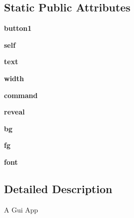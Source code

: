 \subsection*{Static Public Attributes}
\begin{DoxyCompactItemize}
\item 
\hypertarget{class_g_u_i_1_1_application_a6a8ca3a5882888d349cdedc911d175c2}{}\label{class_g_u_i_1_1_application_a6a8ca3a5882888d349cdedc911d175c2} 
{\bfseries button1}
\item 
\hypertarget{class_g_u_i_1_1_application_a90c619c846c3cea133c48377d4a4228d}{}\label{class_g_u_i_1_1_application_a90c619c846c3cea133c48377d4a4228d} 
{\bfseries self}
\item 
\hypertarget{class_g_u_i_1_1_application_ac13dddd2ea333e0d578157201347c34e}{}\label{class_g_u_i_1_1_application_ac13dddd2ea333e0d578157201347c34e} 
{\bfseries text}
\item 
\hypertarget{class_g_u_i_1_1_application_a5f870ca4bff8c0dfb37ddb5d307babb1}{}\label{class_g_u_i_1_1_application_a5f870ca4bff8c0dfb37ddb5d307babb1} 
{\bfseries width}
\item 
\hypertarget{class_g_u_i_1_1_application_a31931931fb7c0b4bae77306bcf5850c2}{}\label{class_g_u_i_1_1_application_a31931931fb7c0b4bae77306bcf5850c2} 
{\bfseries command}
\item 
\hypertarget{class_g_u_i_1_1_application_a84d12d24908d69fac56c33e65e5a7012}{}\label{class_g_u_i_1_1_application_a84d12d24908d69fac56c33e65e5a7012} 
{\bfseries reveal}
\item 
\hypertarget{class_g_u_i_1_1_application_a439307e042d5ce4cd154222b1d480f4e}{}\label{class_g_u_i_1_1_application_a439307e042d5ce4cd154222b1d480f4e} 
{\bfseries bg}
\item 
\hypertarget{class_g_u_i_1_1_application_a558223dab4a1a30fbf9b3562b4a51494}{}\label{class_g_u_i_1_1_application_a558223dab4a1a30fbf9b3562b4a51494} 
{\bfseries fg}
\item 
\hypertarget{class_g_u_i_1_1_application_ad9d9221e2a899fe408e2d8e6796f32f2}{}\label{class_g_u_i_1_1_application_ad9d9221e2a899fe408e2d8e6796f32f2} 
{\bfseries font}
\end{DoxyCompactItemize}


\subsection{Detailed Description}
\begin{DoxyVerb}A Gui App \end{DoxyVerb}
 

